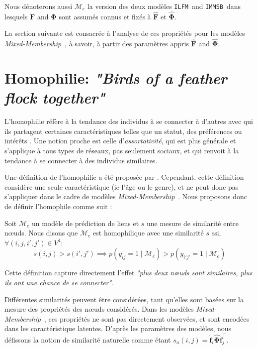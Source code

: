 \documentclass[french]{hermes-journal}
\newcommand{\ilfm}{\texttt{ILFM}}
\newcommand{\immsb}{\texttt{IMMSB}}
\newcommand{\mmm}{\textit{Mixed-Membership}~}
\newcommand{\pr}{p}
\newcommand{\mat}[1]{\bm{#1}}
\begin{document}
Nous dénoterons aussi $\mathcal{M}_e$ la version des deux modèles \ilfm\ and \immsb\ dans lesquels $\mat{F}$ and $\mat{\Phi}$ sont assumés connus et fixés à $\mat{\hat{F}}$ et  $\mat{\hat{\Phi}}$.

La section suivante est consacrée à l'analyse  de ces propriétés pour les modèles \mmm, à savoir, à partir des paramètres appris $\mat{\hat{F}}$ and $\mat{\hat{\Phi}}$.


\section{Homophilie: \emph{"Birds of a feather flock together"}}
\label{sec:homophily}

L'homophilie réfère à la tendance des individus à se connecter à d'autres avec qui ils partagent certaines caractéristiques telles que un statut, des préférences ou intérêts \cite{mcpherson2001birds,lazarsfeld1954friendship}.   Une notion proche est celle d'\emph{assortativité}, qui est plus générale et s'applique à tous types de réseaux, pas seulement sociaux, et qui renvoit à la tendance à se connecter à des individus similaires.


Une définition de l'homophilie a été proposée par \cite{la2010randomization}. Cependant, cette définition considère une seule caractéristique (ie l'âge ou le genre), et ne peut donc pas s'appliquer dans le cadre de modèles \mmm. Nous proposons donc de définir l'homophile comme suit : 
\begin{definition}[Homophilie] \label{def:homophily}
    Soit $\mathcal{M}_e$  un modèle de prédiction de liens et $s$ une mesure de similarité entre n\oe{}uds. Nous disons que $\mathcal{M}_e$ est homophilique avec une similarité $s$ ssi, $\forall (i,j,i',j') \in V^4$:
\begin{equation}
s(i,j) > s(i',j')  \implies \pr(y_{ij}=1 \mid \mathcal{M}_e) > \pr(y_{i'j'}=1  \mid \mathcal{M}_e) \nonumber
\end{equation}

\end{definition}

\noindent Cette définition capture directement l'effet \emph{"plus deux n\oe{}uds sont similaires, plus ils ont une chance de se connecter"}. 

Différentes similarités peuvent être considérées, tant qu'elles sont basées sur la mesure des propriétés des n\oe{}uds considérés.  Dans les modèles \mmm, ces propriétés ne sont pas directement observées, et sont encodées dans les caractéristique latentes. D'après les paramètres des modèles, nous défissons la notion de similarité naturelle comme étant $s_n(i,j) = \mat{\hat{f}}_{i} \mat{\hat{\Phi}} \mat{\hat{f}}_j^\top$.
\end{document}
